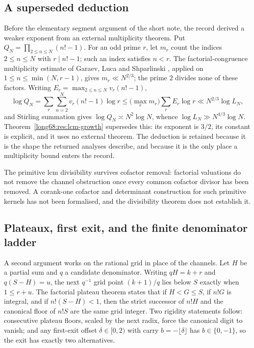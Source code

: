 \documentclass[11pt]{article}
\newcommand{\Ser}{S}
\newcommand{\Lc}{L}
\begin{document}
\subsection{A superseded deduction}\label{long68:sec:ext-superseded}

Before the elementary segment argument of the short note, the record derived
a weaker exponent from an external multiplicity theorem.  Put
$Q_N=\prod_{2\le n\le N}(n!-1)$.  For an odd prime $r$, let $m_r$ count the
indices $2\le n\le N$ with $r\mid n!-1$; such an index satisfies $n<r$.  The
factorial-congruence multiplicity estimate of Garaev, Luca and Shparlinski
\cite[arXiv v1, Thm.~12, p.~16]{garaev-luca-shparlinski}, applied on
$1\le n\le\min(N,r-1)$, gives $m_r\ll N^{2/3}$; the prime $2$ divides none of
these factors.  Writing $E_r=\max_{2\le n\le N}v_r(n!-1)$,
\[
 \log Q_N=\sum_r\sum_{n=2}^{N}v_r(n!-1)\log r
 \le\bigl(\max_r m_r\bigr)\sum_rE_r\log r
 \ll N^{2/3}\log \Lc_N ,
\]
and Stirling summation gives $\log Q_N\asymp N^2\log N$, whence
$\log \Lc_N\gg N^{4/3}\log N$.  Theorem~\ref{long68:res:lcm-growth} supersedes this:
its exponent is $3/2$, its constant is explicit, and it uses no external
theorem.  The deduction is retained because it is the shape the returned
analyses describe, and because it is the only place a multiplicity bound
enters the record.

The primitive lcm divisibility survives cofactor removal: factorial
valuations do not remove the channel obstruction once every common cofactor
divisor has been removed.  A corank-one cofactor and determinant construction
for such primitive kernels has not been formalised, and the divisibility
theorem does not establish it.

\subsection{Plateaux, first exit, and the finite denominator ladder}
\label{long68:sec:ext-plateau}

A second argument works on the rational grid in place of the channels.  Let
$H$ be a partial sum and $q$ a candidate denominator.  Writing $qH=k+r$ and
$q(\Ser-H)=u$, the next $q^{-1}$ grid point $(k+1)/q$ lies below $\Ser$
exactly when $1\le r+u$.  The factorial plateau theorem states that if
$H<G\le\Ser$, if $n!G$ is integral, and if $n!(\Ser-H)<1$, then the strict
successor of $n!H$ and the canonical floor of $n!\Ser$ are the same grid
integer.  Two rigidity statements follow: consecutive plateau floors, scaled
by the next radix, force the canonical digit to vanish; and any first-exit
offset $\delta\in[0,2)$ with carry $b=-\lfloor\delta\rfloor$ has
$b\in\{0,-1\}$, so the exit has exactly two alternatives.
\end{document}
